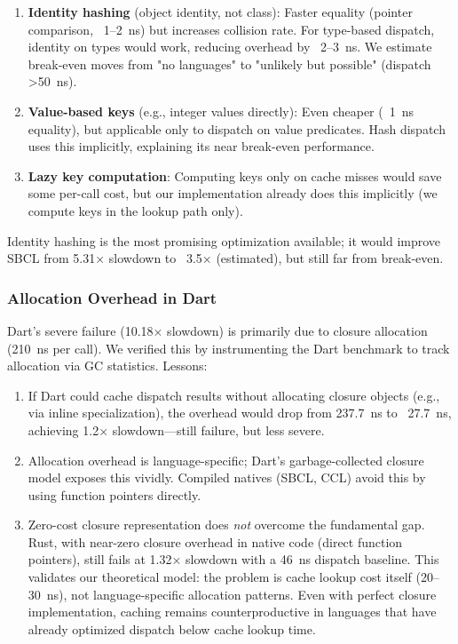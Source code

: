 \documentclass[sigplan,final,acmsmall,review,screen]{acmart}
\begin{document}
\begin{enumerate}
  \item \textbf{Identity hashing} (object identity, not class): Faster equality (pointer comparison, ~1--2~ns) but increases collision rate.
    For type-based dispatch, identity on types would work, reducing overhead by ~2--3~ns. We estimate break-even moves from
    "no languages" to "unlikely but possible" (dispatch >50~ns).

  \item \textbf{Value-based keys} (e.g., integer values directly): Even cheaper (~1~ns equality), but applicable only to dispatch on value predicates.
    Hash dispatch uses this implicitly, explaining its near break-even performance.

  \item \textbf{Lazy key computation}: Computing keys only on cache misses would save some per-call cost, but our implementation already
    does this implicitly (we compute keys in the lookup path only).
\end{enumerate}

Identity hashing is the most promising optimization available; it would improve SBCL from 5.31× slowdown to ~3.5× (estimated),
but still far from break-even.

\subsubsection{Allocation Overhead in Dart}

Dart's severe failure (10.18× slowdown) is primarily due to closure allocation (210~ns per call). We verified this by
instrumenting the Dart benchmark to track allocation via GC statistics. Lessons:

\begin{enumerate}
  \item If Dart could cache dispatch results without allocating closure objects (e.g., via inline specialization),
    the overhead would drop from 237.7~ns to ~27.7~ns, achieving 1.2× slowdown—still failure, but less severe.
  \item Allocation overhead is language-specific; Dart's garbage-collected closure model exposes this vividly.
    Compiled natives (SBCL, CCL) avoid this by using function pointers directly.
  \item Zero-cost closure representation does \emph{not} overcome the fundamental gap. Rust, with near-zero closure overhead in
    native code (direct function pointers), still fails at 1.32× slowdown with a 46~ns dispatch baseline. This validates our
    theoretical model: the problem is cache lookup cost itself (20--30~ns), not language-specific allocation patterns. Even with
    perfect closure implementation, caching remains counterproductive in languages that have already optimized dispatch below
    cache lookup time.
\end{enumerate}
\end{document}
